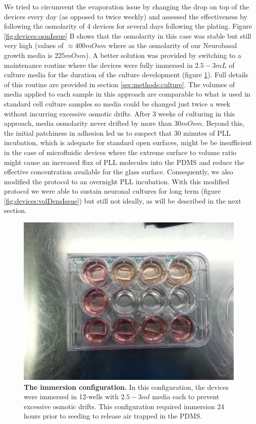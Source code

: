         We tried to circumvent the evaporation issue by changing the drop on top of the devices every day (as opposed to twice weekly) and assessed the effectiveness by following the osmolarity of 4 devices for several days following the plating. Figure \ref{fig:devices:osmIssue} B shows that the osmolarity in this case was stable but still very high (values of \(\approx 400mOsm\) where as the osmolarity of our Neurobasal growth media is \(225 mOsm\)). A better solution was provided by switching to a maintenance routine where the devices were fully immersed in \(2.5-3 mL\) of culture media for the duration of the culture development (figure \ref{fig:devices:immersion}). Full details of this routine are provided in section \ref{sec:methods:culture}. The volumes of media applied to each sample in this approach are comparable to what is used in standard cell culture samples so media could be changed just twice a week without incurring excessive osmotic drifts. After 3 weeks of culturing in this approach, media osmolarity never drifted by more than \(30 mOsm\). Beyond this, the initial patchiness in adhesion led us to suspect that 30 minutes of PLL incubation, which is adequate for standard open surfaces, might be be insufficient in the case of microfluidic devices where the extreme surface to volume ratio might cause an increased flux of PLL molecules into the PDMS and reduce the effective concentration available for the glass surface. Consequently, we also modified the protocol to an overnight PLL incubation. With this modified protocol we were able to sustain neuronal cultures for long term (figure \ref{fig:devices:volDensIssue}) but still not ideally, as will be described in the next section.

        \begin{figure}[h]
           \centering
            \includegraphics[width=12cm]{chapter4/figures/immersionMethod/12WellImmersion.jpg}
            \caption[The immersion maintenance configuration]{\textbf{The immersion configuration.} In this configuration, the devices were immersed in 12-wells with \(2.5-3 ml\) media each to prevent excessive osmotic drifts. This configuration required immersion 24 hours prior to seeding to release air trapped in the PDMS.}
            \label{fig:devices:immersion}
        \end{figure}


